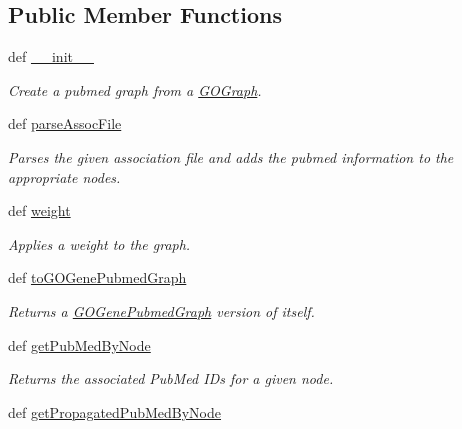 \subsection*{Public Member Functions}
\begin{DoxyCompactItemize}
\item 
def \hyperlink{class_g_o_pubmed_graph_1_1_g_o_pubmed_graph_a67014838ca4e64ab6302e109cfb38baa}{\_\-\_\-init\_\-\_\-}
\begin{DoxyCompactList}\small\item\em Create a pubmed graph from a \hyperlink{namespace_g_o_graph}{GOGraph}. \item\end{DoxyCompactList}\item 
def \hyperlink{class_g_o_pubmed_graph_1_1_g_o_pubmed_graph_ae6b091d89d8aea816c9b87ca9bff96fb}{parseAssocFile}
\begin{DoxyCompactList}\small\item\em Parses the given association file and adds the pubmed information to the appropriate nodes. \item\end{DoxyCompactList}\item 
def \hyperlink{class_g_o_pubmed_graph_1_1_g_o_pubmed_graph_a1cd7af1343cfc3228db50e62ad1d79be}{weight}
\begin{DoxyCompactList}\small\item\em Applies a weight to the graph. \item\end{DoxyCompactList}\item 
def \hyperlink{class_g_o_pubmed_graph_1_1_g_o_pubmed_graph_a9c455a5443e6be4986d7bfbc1ef874c2}{toGOGenePubmedGraph}
\begin{DoxyCompactList}\small\item\em Returns a \hyperlink{namespace_g_o_gene_pubmed_graph}{GOGenePubmedGraph} version of itself. \item\end{DoxyCompactList}\item 
def \hyperlink{class_g_o_pubmed_graph_1_1_g_o_pubmed_graph_a24635a63eda34340ec00919adc165c7c}{getPubMedByNode}
\begin{DoxyCompactList}\small\item\em Returns the associated PubMed IDs for a given node. \item\end{DoxyCompactList}\item 
def \hyperlink{class_g_o_pubmed_graph_1_1_g_o_pubmed_graph_ae37bfd3ab6aa67af25e4975e5e14b47c}{getPropagatedPubMedByNode}

\end{DoxyCompactItemize}
